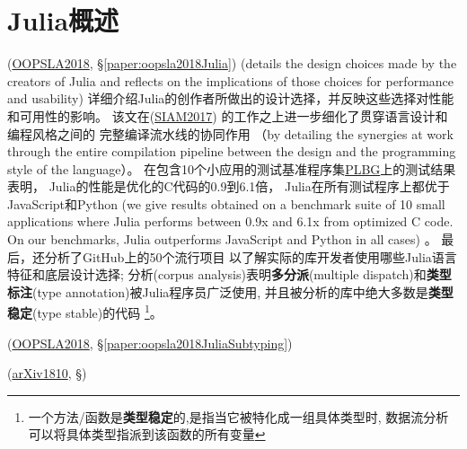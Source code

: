 \section{Julia概述}
\label{sec:julia:intro}
\cite{bezanson2018Julia}
(\href{https://dl.acm.org/citation.cfm?id=3276490}{OOPSLA2018}, 
\S\ref{paper:oopsla2018Julia})
(details the design choices made by the creators of Julia and 
reflects on the implications of those choices for performance
and usability)
详细介绍Julia的创作者所做出的设计选择，并反映这些选择对性能和可用性的影响。
该文在\cite{bezanson2017Julia}(\href{https://epubs.siam.org/doi/10.1137/141000671}{SIAM2017})
的工作之上进一步细化了贯穿语言设计和编程风格之间的
完整编译流水线的协同作用
（by detailing the synergies at work through the entire compilation pipeline between the design and the programming style of the language）。
在包含10个小应用的测试基准程序集\href{https://benchmarksgame-team.pages.debian.net/benchmarksgame/}{PLBG}上的测试结果表明，
Julia的性能是优化的C代码的0.9到6.1倍，
Julia在所有测试程序上都优于JavaScript和Python
(we give results obtained on
a benchmark suite of 10 small applications where Julia performs between 0.9x and 6.1x from
optimized C code. On our benchmarks, Julia outperforms JavaScript and Python in all cases) 。
最后，\cite{bezanson2018Julia}还分析了GitHub上的50个流行项目
以了解实际的库开发者使用哪些Julia语言特征和底层设计选择;
分析(corpus analysis)表明\textbf{多分派}(multiple dispatch)和\textbf{类型标注}(type annotation)被Julia程序员广泛使用,
并且被分析的库中绝大多数是\textbf{类型稳定}(type stable)的代码
\footnote{一个方法/函数是\textbf{类型稳定}的,是指当它被特化成一组具体类型时,
数据流分析可以将具体类型指派到该函数的所有变量}。

\cite{nardelli2018JuliaSubtyping}(\href{https://dl.acm.org/citation.cfm?doid=3288538.3276483}{OOPSLA2018}, \S\ref{paper:oopsla2018JuliaSubtyping})

\cite{fischer2018juliaMLtoTPU}(\href{https://arxiv.org/abs/1810.09868}{arXiv1810}, \S\label{paper:arxiv1810JuliaMLtoTPU})